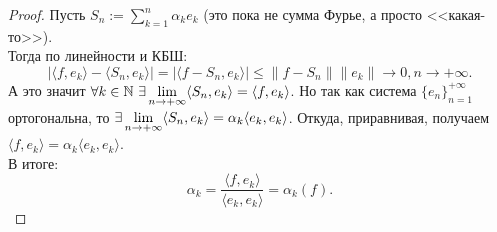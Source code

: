 \begin{proof}
    Пусть $S_n := \sum\limits_{k = 1}^n \alpha_k e_k$ (это пока не сумма Фурье, а просто <<какая-то>>).\\
    Тогда по линейности и КБШ:
    \[
        |\langle f, e_k \rangle - \langle S_n, e_k \rangle| = |\langle f - S_n, e_k \rangle| \leq \|f - S_n\| \|e_k\| \rightarrow 0, n \rightarrow +\infty.
    \]
    А это значит $\forall k \in \mathbb{N} \ \exists \lim\limits_{n \rightarrow +\infty} \langle S_n, e_k \rangle = \langle f, e_k \rangle$.
    Но так как система $\{e_n\}_{n = 1}^{+\infty}$ ортогональна, то $\exists \lim\limits_{n \rightarrow +\infty} \langle S_n, e_k \rangle = \alpha_k  \langle e_k, e_k \rangle$. Откуда, приравнивая, получаем $\langle f, e_k \rangle = \alpha_k  \langle e_k, e_k \rangle$.\\
    В итоге:
    \[
        \alpha_k = \frac{\langle f, e_k \rangle}{\langle e_k, e_k \rangle} = \alpha_k(f).
    \]
\end{proof}

